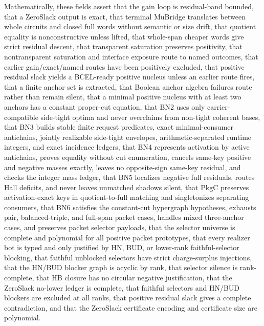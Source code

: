 \documentclass[10.5pt,a4paper]{article}
\begin{document}
Mathematically, these fields assert that the gain loop is residual-band bounded, that a ZeroSlack output is exact, that terminal MuBridge translates between whole circuits and closed full words without semantic or size drift, that quotient equality is nonconstructive unless lifted, that whole-span cheaper words give strict residual descent, that transparent saturation preserves positivity, that nontransparent saturation and interface exposure route to named outcomes, that earlier gain/exact/named routes have been positively excluded, that positive residual slack yields a BCEL-ready positive nucleus unless an earlier route fires, that a finite anchor set is extracted, that Boolean anchor algebra failures route rather than remain silent, that a minimal positive nucleus with at least two anchors has a constant proper-cut equation, that BN2 uses only carrier-compatible side-tight optima and never overclaims from non-tight coherent bases, that BN3 builds stable finite request predicates, exact minimal-consumer antichains, jointly realizable side-tight envelopes, arithmetic-separated runtime integers, and exact incidence ledgers, that BN4 represents activation by active antichains, proves equality without cut enumeration, cancels same-key positive and negative masses exactly, leaves no opposite-sign same-key residual, and checks the integer mass ledger, that BN5 localizes negative full residuals, routes Hall deficits, and never leaves unmatched shadows silent, that PkgC preserves activation-exact keys in quotient-to-full matching and singletonizes separating consumers, that BN6 satisfies the constant-cut hypergraph hypotheses, exhausts pair, balanced-triple, and full-span packet cases, handles mixed three-anchor cases, and preserves packet selector payloads, that the selector universe is complete and polynomial for all positive packet prototypes, that every realizer bot is typed and only justified by HN, BUD, or lower-rank faithful-selector blocking, that faithful unblocked selectors have strict charge-surplus injections, that the HN/BUD blocker graph is acyclic by rank, that selector silence is rank-complete, that HB closure has no circular negative justification, that the ZeroSlack no-lower ledger is complete, that faithful selectors and HN/BUD blockers are excluded at all ranks, that positive residual slack gives a complete contradiction, and that the ZeroSlack certificate encoding and certificate size are polynomial.
\end{document}
